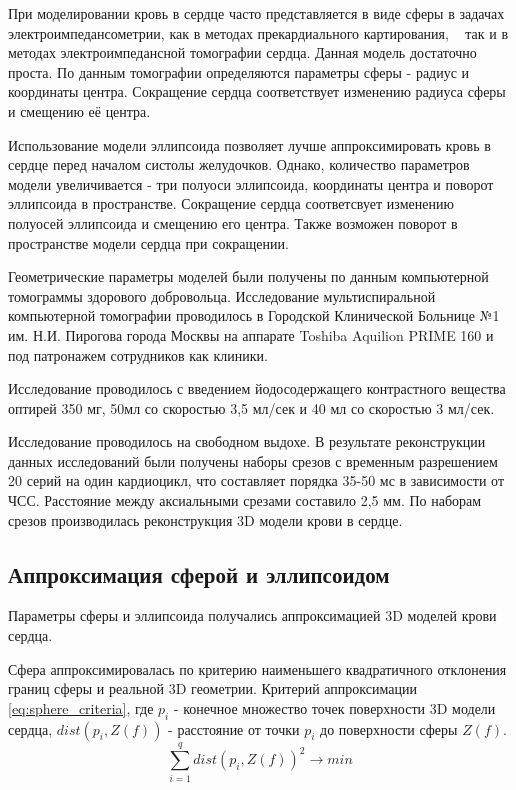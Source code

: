 \documentclass[conference]{IEEEtran}
\begin{document}
При моделировании кровь в сердце часто представляется в виде сферы в задачах электроимпедансометрии, как в методах прекардиального картирования,
~\cite{Tikhomirov2019}
так и в методах электроимпедансной томографии сердца.
Данная модель достаточно проста.
По данным томографии определяются параметры сферы - радиус и координаты центра.
Сокращение сердца соответствует изменению радиуса сферы и смещению её центра.

Использование модели эллипсоида позволяет лучше аппроксимировать кровь в сердце перед началом систолы желудочков.
Однако, количество параметров модели увеличивается - три полуоси эллипсоида, координаты центра и поворот эллипсоида в пространстве.
Сокращение сердца соответсвует изменению полуосей эллипсоида и смещению его центра.
Также возможен поворот в пространстве модели сердца при сокращении.

Геометрические параметры моделей были получены по данным компьютерной томограммы здорового добровольца.
Исследование мультиспиральной компьютерной томографии проводилось в Городской Клинической Больнице №1 им. Н.И. Пирогова города Москвы на аппарате Toshiba
Aquilion PRIME 160 и под патронажем сотрудников как клиники.

Исследование проводилось с введением йодосодержащего контрастного вещества оптирей 350 мг,
50мл со скоростью 3,5 мл/сек и 40 мл со скоростью 3 мл/сек.

Исследование проводилось на свободном выдохе.
В результате реконструкции данных исследований были получены наборы срезов
с временным разрешением 20 серий на один кардиоцикл, что составляет порядка 35-50 мс
в зависимости от ЧСС.
Расстояние между аксиальными срезами составило 2,5 мм.
По наборам срезов производилась реконструкция 3D модели крови в сердце.

\subsection{Аппроксимация сферой и эллипсоидом}
Параметры сферы и эллипсоида получались аппроксимацией 3D моделей крови сердца.

Сфера аппроксимировалась по критерию наименьшего квадратичного отклонения границ сферы и реальной 3D геометрии.
Критерий аппроксимации \ref{eq:sphere_criteria},
где $ p_i$ - конечное множество точек поверхности 3D модели сердца,
$dist(p_i,Z(f))$ - расстояние от точки $ p_i$ до поверхности сферы $Z(f)$.
\begin{equation}
    \sum_{i=1}^{q}dist(p_i,Z(f))^2 \rightarrow min
    \label{eq:sphere_criteria}
\end{equation}
\end{document}
